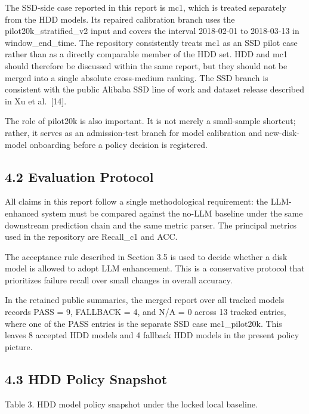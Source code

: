 \documentclass[
  11pt,
  a4paper]{article}
\begin{document}
The SSD-side case reported in this report is mc1, which is treated
separately from the HDD models. Its repaired calibration branch uses the
pilot20k\_stratified\_v2 input and covers the interval 2018-02-01 to
2018-03-13 in window\_end\_time. The repository consistently treats mc1
as an SSD pilot case rather than as a directly comparable member of the
HDD set. HDD and mc1 should therefore be discussed within the same
report, but they should not be merged into a single absolute
cross-medium ranking. The SSD branch is consistent with the public
Alibaba SSD line of work and dataset release described in Xu et
al.~{[}14{]}.

The role of pilot20k is also important. It is not merely a small-sample
shortcut; rather, it serves as an admission-test branch for model
calibration and new-disk-model onboarding before a policy decision is
registered.

\hypertarget{evaluation-protocol}{%
\subsection{4.2 Evaluation Protocol}\label{evaluation-protocol}}

All claims in this report follow a single methodological requirement:
the LLM-enhanced system must be compared against the no-LLM baseline
under the same downstream prediction chain and the same metric parser.
The principal metrics used in the repository are Recall\_c1 and ACC.

The acceptance rule described in Section 3.5 is used to decide whether a
disk model is allowed to adopt LLM enhancement. This is a conservative
protocol that prioritizes failure recall over small changes in overall
accuracy.

In the retained public summaries, the merged report over all tracked
models records PASS = 9, FALLBACK = 4, and N/A = 0 across 13 tracked
entries, where one of the PASS entries is the separate SSD case
mc1\_pilot20k. This leaves 8 accepted HDD models and 4 fallback HDD
models in the present policy picture.

\hypertarget{hdd-policy-snapshot}{%
\subsection{4.3 HDD Policy Snapshot}\label{hdd-policy-snapshot}}

Table 3. HDD model policy snapshot under the locked local baseline.
\end{document}
